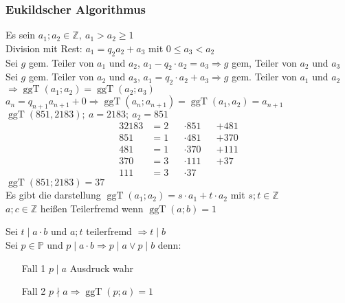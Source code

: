 \documentclass[12pt,a4paper]{article}
\DeclareMathOperator\ggt{ggT}
\begin{document}
\subsubsection{Eukildscher Algorithmus}
Es sein $a_1;a_2 \in \mathbb{Z},\ a_1 > a_2 \geq 1$ \\
Division mit Rest: $a_1 = q_2 a_2 + a_3$ mit $0 \leq a_3 < a_2$ \\
Sei $g$ gem. Teiler von $a_1$ und $a_2$, $a_1 - q_2 \cdot a_2 = a_3 \Rightarrow g$ gem, Teiler von $a_2$ und $a_3$ \\
Sei $g$ gem. Teiler von $a_2$ und $a_3$, $a_1 = q_2 \cdot a_2 + a_3 \Rightarrow g$ gem. Teiler von $a_1$ und $a_2$ \\
$\Rightarrow \ggt(a_1;a_2) = \ggt(a_2;a_3)$ \\
$a_{n}=q_{n+1}a_{n+1} + 0 \Rightarrow \ggt(a_n;a_{n+1}) = \ggt(a_1,a_2) = a_{n+1}$ \\
$\ggt(851,2183);\ a=2183;\ a_2 = 851$ \\
\begin{alignat*}{3}
	2183 & = 2 &  & \cdot 851 &  & + 481 \\
	851  & = 1 &  & \cdot 481 &  & + 370 \\
	481  & = 1 &  & \cdot 370 &  & + 111 \\
	370  & = 3 &  & \cdot 111 &  & + 37  \\
	111  & = 3 &  & \cdot 37
\end{alignat*}
$\ggt(851;2183) = 37$ \\

Es gibt die darstellung $\ggt(a_1;a_2) = s\cdot a_1 + t \cdot a_2$ mit $s;t \in \mathbb{Z}$ \\

$a;c \in \mathbb{Z}$ heißen Teilerfremd wenn $\ggt(a;b) = 1$ \par
Sei $t \mid a \cdot b$ und $a;t$ teilerfremd $\Rightarrow t \mid b$ \\

Sei $p \in \mathbb{P}$ und $p \mid a \cdot b \Rightarrow p \mid a \vee p \mid b$ denn:
\begin{itemize}
	\item[Fall 1] $p \mid a$ Ausdruck wahr
	\item[Fall 2] $p \nmid a \Rightarrow \ggt(p;a) = 1$
\end{itemize}
\end{document}
